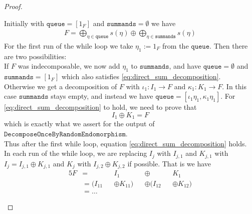 \begin{proof}
\begin{subproof}
\noindent Initially with $\mathtt{queue} = [1_{F}]$ and $\mathtt{summands} = \emptyset$ we have
\begin{align}
F = \label{eq:direct_sum_decomposition}
\bigoplus_{\eta \in \mathtt{queue}} s(\eta) \oplus \bigoplus_{\eta \in \mathtt{summands}} s(\eta)
\end{align}
For the first run of the while loop we take $\eta_{1} := 1_{F}$ from the $\mathtt{queue}$. Then there are two possibilities:\\
If $F$ was indecomposable, we now add $\eta_{1}$ to $\mathtt{summands}$, and have $\mathtt{queue} = \emptyset$ and
$\mathtt{summands} = [1_{F}]$ which also satisfies \eqref{eq:direct_sum_decomposition}.\\
Otherwise we get a decomposition of $F$ with $\iota_{1} : I_{1} \rightarrow F$ and $\kappa_{1} : K_{1} \rightarrow F$. In this case
$\mathtt{summands}$ stays empty, and instead we have $\mathtt{queue} = [\iota_{1}\eta_{1}, \kappa_{1}\eta_{1}]$. For
\eqref{eq:direct_sum_decomposition} to hold, we need to prove that
\[
I_{1} \oplus K_{1} = F
\]
which is exactly what we assert for the output of $\mathtt{DecomposeOnceByRandomEndomorphism}$.\\
Thus after the first while loop, equation \eqref{eq:direct_sum_decomposition} holds.\\
In each run of the while loop, we are replacing $I_{j}$ with $I_{j,1}$ and $K_{j,1}$ with $I_{j} = I_{j,1} \oplus K_{j,1}$ and
$K_{j}$ with $I_{j,2} \oplus K_{j,2}$ if possible. That is we have 
\begin{alignat*}{5}
F &=  &&I_{1} &&\oplus &&K_{1} \\
&= (I_{11} &&\oplus K_{11}) &&\oplus (I_{12} &&\oplus K_{12}) \\
&= \dots
\end{alignat*}


\end{subproof}
\end{proof}

